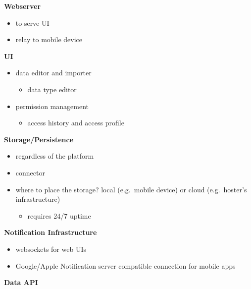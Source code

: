 \documentclass[12pt,english,a4paper,titlepage,cleardoublepage=empty,dottedtoc]{report}
\providecommand{\tightlist}{%
  \setlength{\itemsep}{0pt}\setlength{\parskip}{0pt}}
\begin{document}
\textbf{Webserver}

\begin{itemize}
\tightlist
\item
  to serve UI
\item
  relay to mobile device
\end{itemize}

\textbf{UI}

\begin{itemize}
\tightlist
\item
  data editor and importer

  \begin{itemize}
  \tightlist
  \item
    data type editor
  \end{itemize}
\item
  permission management

  \begin{itemize}
  \tightlist
  \item
    access history and access profile
  \end{itemize}
\end{itemize}

\textbf{Storage/Persistence}

\begin{itemize}
\tightlist
\item
  regardless of the platform
\item
  connector
\item
  where to place the storage? local (e.g.~mobile device) or cloud
  (e.g.~hoster's infrastructure)

  \begin{itemize}
  \tightlist
  \item
    requires 24/7 uptime
  \end{itemize}
\end{itemize}

\textbf{Notification Infrastructure}

\begin{itemize}
\tightlist
\item
  websockets for web UIs
\item
  Google/Apple Notification server compatible connection for mobile apps
\end{itemize}

\textbf{Data API}
\end{document}
